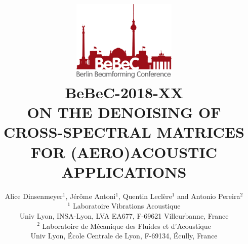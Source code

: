 \documentclass[fontsize=12pt,DIV13,paper=a4,abstract=true,titlepage=false]{scrartcl}
\begin{document}

\def\papernumber{BeBeC-2018-XX}
\title{%
\vspace{-30mm} %
\includegraphics[width=50mm]{logo_BeBeC_lrg_CMYK}\\
\null\vspace{-54mm}
{\hfill\large{\papernumber}}\\
\vspace{45mm}
\Large{
ON THE DENOISING OF CROSS-SPECTRAL MATRICES FOR (AERO)ACOUSTIC APPLICATIONS
}}

\author{
 \normalsize{Alice Dinsenmeyer$^1$, Jérôme Antoni$^1$, Quentin Leclère$^1$ and  Antonio Pereira$^2$}\\[-0.4em]
 \small{$^1$ Laboratoire Vibrations Acoustique}\\[-0.4em]
 \small{Univ Lyon, INSA-Lyon, LVA EA677, F-69621 Villeurbanne, France}\\[-0.4em]
 \small{$^2$ Laboratoire de Mécanique des Fluides et d’Acoustique }\\[-0.4em]
 \small{Univ Lyon, École Centrale de Lyon, F-69134, Écully, France}
\date{}
}

\maketitle
\end{document}
